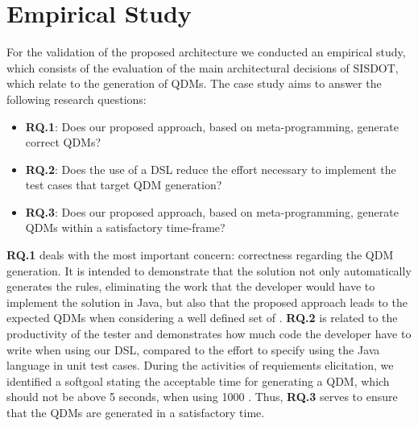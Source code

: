 \section{Empirical Study}
\label{sec:case_study} 


For the validation of the proposed architecture we conducted an empirical study,
which consists of the evaluation of the main 
architectural decisions of SISDOT, which relate to the generation of QDMs.
The case study aims to answer the 
following research questions:

\begin{itemize}

\item \textbf{RQ.1}: Does our proposed approach, based on meta-programming, generate correct QDMs?

\item \textbf{RQ.2}: Does the use of a DSL reduce the effort necessary to implement the test cases that target QDM generation? 

\item \textbf{RQ.3}: Does our proposed approach, based on meta-programming, generate QDMs within a satisfactory time-frame?

\end{itemize}


\textbf{RQ.1} deals with the most important concern: correctness regarding the QDM generation. It is intended 
to demonstrate that the solution not only automatically generates the rules, eliminating the work that the developer 
would have to implement the solution in Java, but also that the proposed approach leads to the expected QDMs when considering 
a well defined set of \callers.
\textbf{RQ.2} is related to the productivity of the tester and demonstrates how much code the 
developer have to write when using our DSL, compared to the effort to specify \callers using the Java language in 
unit test cases. During the activities of requiements elicitation,
we identified a softgoal stating the  acceptable time for generating a QDM, 
which should not be above 5 seconds, when using 1000 \callers.
Thus, \textbf{RQ.3} serves to ensure that the QDMs are generated in a satisfactory time.

